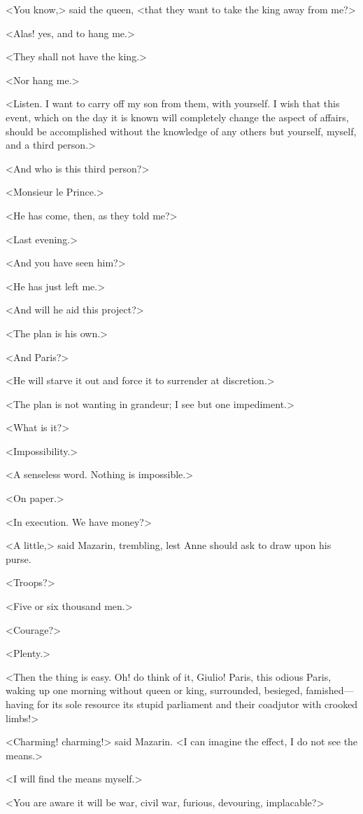 <You know,> said the queen, <that they want to take the king away from me?>

<Alas! yes, and to hang me.>

<They shall not have the king.>

<Nor hang me.>

<Listen. I want to carry off my son from them, with yourself. I wish that this event, which on the day it is known will completely change the aspect of affairs, should be accomplished without the knowledge of any others but yourself, myself, and a third person.>

<And who is this third person?>

<Monsieur le Prince.>

<He has come, then, as they told me?>

<Last evening.>

<And you have seen him?>

<He has just left me.>

<And will he aid this project?>

<The plan is his own.>

<And Paris?>

<He will starve it out and force it to surrender at discretion.>

<The plan is not wanting in grandeur; I see but one impediment.>

<What is it?>

<Impossibility.>

<A senseless word. Nothing is impossible.>

<On paper.>

<In execution. We have money?>

<A little,> said Mazarin, trembling, lest Anne should ask to draw upon his purse.

<Troops?>

<Five or six thousand men.>

<Courage?>

<Plenty.>

<Then the thing is easy. Oh! do think of it, Giulio! Paris, this odious Paris, waking up one morning without queen or king, surrounded, besieged, famished—having for its sole resource its stupid parliament and their coadjutor with crooked limbs!>

<Charming! charming!> said Mazarin. <I can imagine the effect, I do not see the means.>

<I will find the means myself.>

<You are aware it will be war, civil war, furious, devouring, implacable?>

